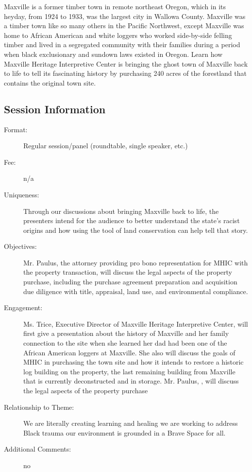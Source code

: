 \documentclass{report}
\begin{document}
              Maxville is a former timber town in remote northeast Oregon, which in its heyday, from 1924 to 1933, was the largest city in Wallowa County. Maxville was a timber town like so many others in the Pacific Northwest, except Maxville was home to African American and white loggers who worked side-by-side felling timber and lived in a segregated community with their families during a period when black exclusionary and sundown laws existed in Oregon. Learn how Maxville Heritage Interpretive Center is bringing the ghost town of Maxville back to life to tell its fascinating history by purchasing 240 acres of the forestland that contains the original town site.

              \subsection*{Session Information}
                \begin{description}
                  \item [Format:] Regular session/panel (roundtable, single speaker, etc.)
							    
								  \item [Fee:]n/a
							     
							    \item [Uniqueness:]Through our discussions about bringing Maxville back to life, the presenters intend for the audience to better understand the state’s racist origins and how using the tool of land conservation can help tell that story.
							    \item [Objectives:]Mr. Paulus, the attorney providing pro bono representation for MHIC with the property transaction, will discuss the legal aspects of the property purchase, including the purchase agreement preparation and acquisition due diligence with title, appraisal, land use, and environmental compliance.
							    \item [Engagement:]Ms. Trice, Executive Director of Maxville Heritage Interpretive Center, will first give a presentation about the history of Maxville and her family connection to the site when she learned her dad had been one of the African American loggers at Maxville. She also will discuss the goals of MHIC in purchasing the town site and how it intends to restore a historic log building on the property, the last remaining building from Maxville that is currently deconstructed and in storage. 
Mr. Paulus, , will discuss the legal aspects of the property purchase
							    \item [Relationship to Theme:]We are literally creating learning and healing we are working to address Black trauma  our environment is grounded in a Brave Space for all.
							    
                    \item [Additional Comments: ]no

                \end{description}
\end{document}
